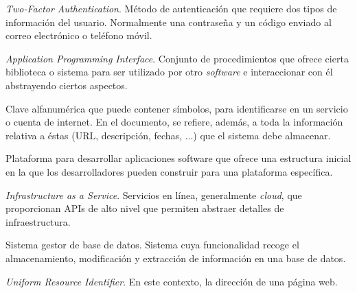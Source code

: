 \documentclass{article}
\begin{document}
\begin{description}
   \setlength\itemsep{0em}
   \item[2FA] \textit{Two-Factor Authentication}. Método de autenticación que requiere dos tipos de información del usuario. Normalmente una contraseña y un código enviado al correo electrónico o teléfono móvil.
   \item[API] \textit{Application Programming Interface}. Conjunto de procedimientos que ofrece cierta biblioteca o sistema para ser utilizado por otro \textit{software} e interaccionar con él abstrayendo ciertos aspectos.
   \item[Contraseña] Clave alfanumérica que puede contener símbolos, para identificarse en un servicio o cuenta de internet. En el documento, se refiere, además, a toda la información relativa a éstas (URL, descripción, fechas, ...) que el sistema debe almacenar.
   \item[Framework] Plataforma para desarrollar aplicaciones software que ofrece una estructura inicial en la que los desarrolladores pueden construir para una plataforma específica. 
   \item[IaaS] \textit{Infrastructure as a Service}. Servicios en línea, generalmente \textit{cloud}, que proporcionan APIs de alto nivel que permiten abstraer detalles de infraestructura.
   \item[SGBD] Sistema gestor de base de datos. Sistema cuya funcionalidad recoge el almacenamiento, modificación y extracción de información en una base de datos.
   \item[URL] \textit{Uniform Resource Identifier}. En este contexto, la dirección de una página web. 
\end{description}
\end{document}
